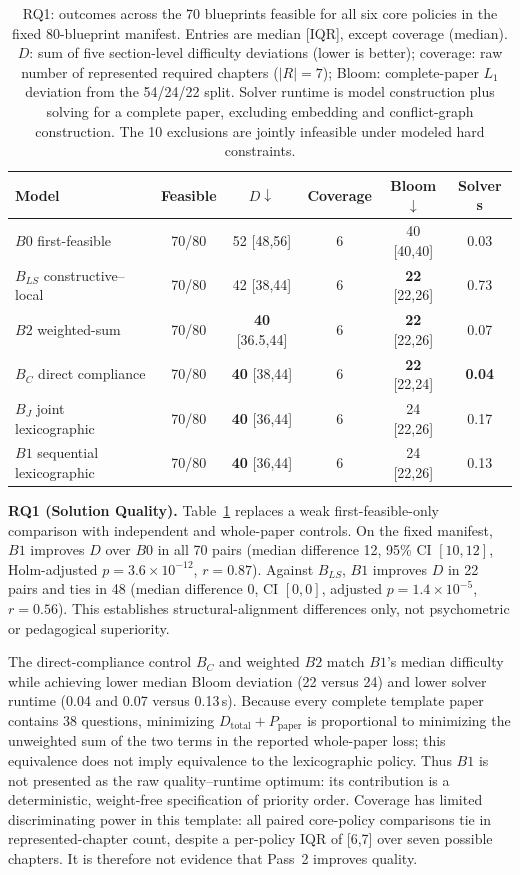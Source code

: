 \documentclass[runningheads]{llncs}
\begin{document}
\begin{table}[t]
\caption{RQ1: outcomes across the 70 blueprints feasible for all six core policies in the fixed 80-blueprint manifest. Entries are median [IQR], except coverage (median). $D$: sum of five section-level difficulty deviations (lower is better); coverage: raw number of represented required chapters ($|R|=7$); Bloom: complete-paper $L_1$ deviation from the 54/24/22 split. Solver runtime is model construction plus solving for a complete paper, excluding embedding and conflict-graph construction. The 10 exclusions are jointly infeasible under modeled hard constraints.}
\label{tab:rq1}
\centering
\small
\begin{tabular}{@{}lccccc@{}}
\toprule
\textbf{Model} & \textbf{Feasible} & $D\downarrow$ & \textbf{Coverage} & \textbf{Bloom}$\downarrow$ & \textbf{Solver s} \\
\midrule
$B0$ first-feasible        & 70/80 & 52 [48,56] & 6 & 40 [40,40] & 0.03 \\
$B_{LS}$ constructive--local & 70/80 & 42 [38,44] & 6 & \textbf{22} [22,26] & 0.73 \\
$B2$ weighted-sum          & 70/80 & \textbf{40} [36.5,44] & 6 & \textbf{22} [22,26] & 0.07 \\
$B_C$ direct compliance    & 70/80 & \textbf{40} [38,44] & 6 & \textbf{22} [22,24] & \textbf{0.04} \\
$B_J$ joint lexicographic  & 70/80 & \textbf{40} [36,44] & 6 & 24 [22,26] & 0.17 \\
$B1$ sequential lexicographic & 70/80 & \textbf{40} [36,44] & 6 & 24 [22,26] & 0.13 \\
\bottomrule
\end{tabular}
\end{table}

\noindent\textbf{RQ1 (Solution Quality).} Table~\ref{tab:rq1} replaces a weak first-feasible-only comparison with independent and whole-paper controls. On the fixed manifest, $B1$ improves $D$ over $B0$ in all 70 pairs (median difference 12, 95\% CI $[10,12]$, Holm-adjusted $p=3.6{\times}10^{-12}$, $r=0.87$). Against $B_{LS}$, $B1$ improves $D$ in 22 pairs and ties in 48 (median difference 0, CI $[0,0]$, adjusted $p=1.4{\times}10^{-5}$, $r=0.56$). This establishes structural-alignment differences only, not psychometric or pedagogical superiority.

The direct-compliance control $B_C$ and weighted $B2$ match $B1$'s median difficulty while achieving lower median Bloom deviation (22 versus 24) and lower solver runtime (0.04 and 0.07 versus 0.13\,s). Because every complete template paper contains 38 questions, minimizing $D_{\mathrm{total}}+P_{\mathrm{paper}}$ is proportional to minimizing the unweighted sum of the two terms in the reported whole-paper loss; this equivalence does not imply equivalence to the lexicographic policy. Thus $B1$ is not presented as the raw quality--runtime optimum: its contribution is a deterministic, weight-free specification of priority order. Coverage has limited discriminating power in this template: all paired core-policy comparisons tie in represented-chapter count, despite a per-policy IQR of [6,7] over seven possible chapters. It is therefore not evidence that Pass~2 improves quality.
\end{document}
